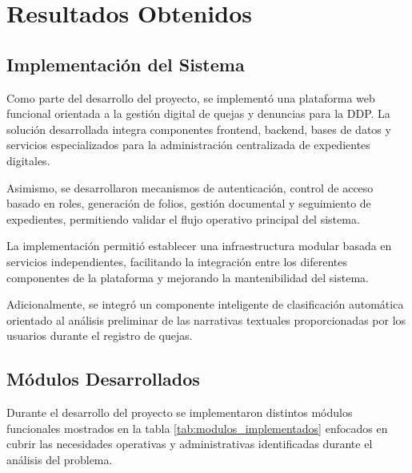 
\chapter{Resultados Obtenidos}
\label{cap:resultados_obtenidos}
\justifying

\section{Implementación del Sistema}

Como parte del desarrollo del proyecto, se implementó una plataforma web funcional orientada a la gestión digital de quejas y denuncias para la DDP. La solución desarrollada integra componentes frontend, backend, bases de datos y servicios especializados para la administración centralizada de expedientes digitales.

Asimismo, se desarrollaron mecanismos de autenticación, control de acceso basado en roles, generación de folios, gestión documental y seguimiento de expedientes, permitiendo validar el flujo operativo principal del sistema.

La implementación permitió establecer una infraestructura modular basada en servicios independientes, facilitando la integración entre los diferentes componentes de la plataforma y mejorando la mantenibilidad del sistema.

Adicionalmente, se integró un componente inteligente de clasificación automática orientado al análisis preliminar de las narrativas textuales proporcionadas por los usuarios durante el registro de quejas.

\section{Módulos Desarrollados}

Durante el desarrollo del proyecto se implementaron distintos módulos funcionales mostrados en la tabla \ref{tab:modulos_implementados} enfocados en cubrir las necesidades operativas y administrativas identificadas durante el análisis del problema.


